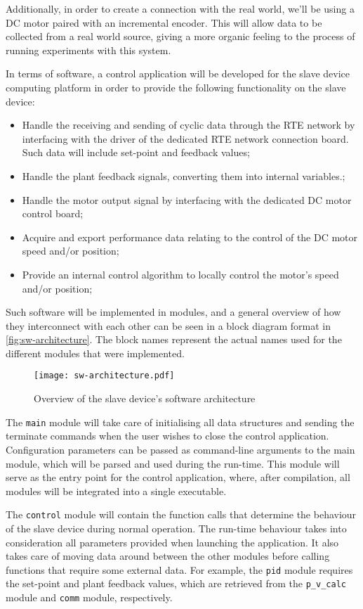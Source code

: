 Additionally, in order to create a connection with the real world, we'll be using a DC motor paired with an incremental encoder.
This will allow data to be collected from a real world source, giving a more organic feeling to the process of running experiments with this system.

In terms of software, a control application will be developed for the slave device computing platform in order to provide the following functionality on the slave device:
\begin{itemize}
	\item Handle the receiving and sending of cyclic data through the RTE network by interfacing with the driver of the dedicated RTE network connection board. Such data will include set-point and feedback values;
	\item Handle the plant feedback signals, converting them into internal variables.;
	\item Handle the motor output signal by interfacing with the dedicated DC motor control board;
	\item Acquire and export performance data relating to the control of the DC motor speed and/or position;
	\item Provide an internal control algorithm to locally control the motor's speed and/or position;
\end{itemize}

Such software will be implemented in modules, and a general overview of how they interconnect with each other can be seen in a block diagram format in \autoref{fig:sw-architecture}.
The block names represent the actual names used for the different modules that were implemented.

\begin{figure}[htp]
	\centering
	\texttt{[image: sw-architecture.pdf]}
	\caption{Overview of the slave device's software architecture}
	\label{fig:sw-architecture}
\end{figure}

The \verb|main| module will take care of initialising all data structures and sending the terminate commands when the user wishes to close the control application.
Configuration parameters can be passed as command-line arguments to the main module, which will be parsed and used during the run-time.
This module will serve as the entry point for the control application, where, after compilation, all modules will be integrated into a single executable.

The \verb|control| module will contain the function calls that determine the behaviour of the slave device during normal operation.
The run-time behaviour takes into consideration all parameters provided when launching the application.
It also takes care of moving data around between the other modules before calling functions that require some external data.
For example, the \verb|pid| module requires the set-point and plant feedback values, which are retrieved from the \verb|p_v_calc| module and \verb|comm| module, respectively.

